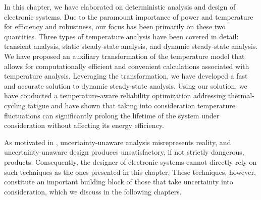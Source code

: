 In this chapter, we have elaborated on deterministic analysis and design of
electronic systems. Due to the paramount importance of power and temperature for
efficiency and robustness, our focus has been primarily on these two quantities.
Three types of temperature analysis have been covered in detail: transient
analysis, static steady-state analysis, and dynamic steady-state analysis. We
have proposed an auxiliary transformation of the temperature model that allows
for computationally efficient and convenient calculations associated with
temperature analysis. Leveraging the transformation, we have developed a fast
and accurate solution to dynamic steady-state analysis. Using our solution, we
have conducted a temperature-aware reliability optimization addressing
thermal-cycling fatigue and have shown that taking into consideration
temperature fluctuations can significantly prolong the lifetime of the system
under consideration without affecting its energy efficiency.

As motivated in , uncertainty-unaware analysis misrepresents
reality, and uncertainty-unaware design produces unsatisfactory, if not strictly
dangerous, products. Consequently, the designer of electronic systems cannot
directly rely on such techniques as the ones presented in this chapter. These
techniques, however, constitute an important building block of those that take
uncertainty into consideration, which we discuss in the following chapters.
